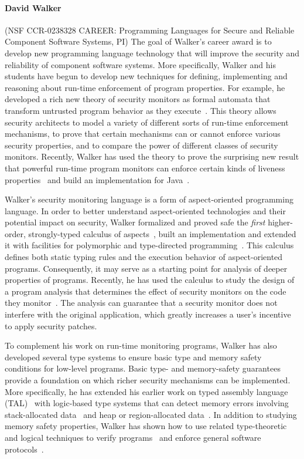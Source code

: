 \documentclass[11pt]{article}
\begin{document}
\paragraph*{David Walker} (NSF CCR-0238328 CAREER: Programming Languages for Secure and Reliable Component Software
Systems, PI)
The goal of Walker's career award is to develop new programming language
technology that will improve the security and reliability of component software systems.
More specifically, Walker and his students have begun to develop new techniques for defining,
implementing and reasoning about run-time enforcement of program properties.
For example, he developed a rich new theory of security monitors as formal
automata that transform untrusted program behavior as they 
execute~\cite{ligatti+:edit-automata}.
This theory allows security
architects to model a variety of different sorts of run-time
enforcement mechanisms, to prove that certain mechanisms can or cannot
enforce various security properties, and to compare the power of
different classes of security monitors.    Recently, Walker 
has used the theory to prove the surprising new result that powerful run-time
program monitors can enforce certain kinds of liveness properties~\cite{ligatti+:renewal}
and build an implementation for Java~\cite{bauer+:polymer}.

Walker's security monitoring language is a form of aspect-oriented programming language.
In order to better understand aspect-oriented technologies and their
potential impact on security, Walker formalized and proved
safe the {\em first} higher-order, strongly-typed calculus of 
aspects~\cite{walker+:aspects}, built an implementation and extended it with facilities for polymorphic
and type-directed programming~\cite{dantas+:polyaml}.  This calculus defines
both static typing rules and the execution behavior of aspect-oriented
programs.  Consequently, it may
serve as a starting point for analysis of deeper properties of programs.
Recently, he has used the calculus to study the design of a
program analysis that determines the effect of security monitors on
the code they monitor~\cite{dantas+:harmless-advice,dantas+:harmless-popl}.   The analysis
can guarantee that a security monitor does not interfere with the 
original application, which greatly increases a user's incentive
to apply security patches.

To complement his work on run-time monitoring programs, Walker has also
developed several type systems to ensure basic type and memory safety conditions
for low-level programs.  Basic type- and memory-safety guarantees provide a foundation on which
richer security mechanisms can be implemented.  More specifically, he
has extended his earlier work on typed assembly language (TAL)~\cite{morrisett+:tal,morrisett+:journal-stal} with
logic-based type systems that can detect memory errors involving
stack-allocated data~\cite{ahmed+:stack,jia+:stack} and heap or region-allocated
data~\cite{ahmed+:hierarchical-storage}.  In addition to studying memory safety
properties, Walker has shown how to use related type-theoretic and logical techniques
to verify programs~\cite{jia+:ilc} and enforce general software
protocols~\cite{mandelbaum+:refinements}.  
\end{document}
